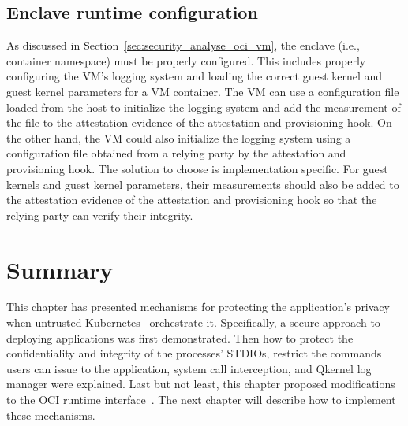 \subsection{Enclave runtime configuration}

As discussed in Section~\ref{sec:security_analyse_oci_vm}, the enclave (i.e., container namespace) must be properly configured. This includes properly configuring the VM's logging system and loading the correct guest kernel and guest kernel parameters for a VM container. The VM can use a configuration file loaded from the host to initialize the logging system 
and add the measurement of the file to the attestation evidence of the attestation and provisioning hook. On the other hand, the VM could also initialize the logging system using a configuration file obtained from a relying party by the attestation and provisioning hook. The solution to choose is implementation specific. For guest kernels and guest kernel parameters, their 
measurements should also be added to the attestation evidence of the attestation and provisioning hook so that the relying party can verify their integrity.
  

\section{Summary}
This chapter has presented mechanisms for protecting the application's privacy when untrusted Kubernetes~\cite*{k8s} orchestrate it. Specifically, a secure approach to deploying applications was first demonstrated. Then how to protect 
the confidentiality and integrity of the processes' STDIOs, restrict the commands users can issue to the application, system call interception, and Qkernel log manager were explained. Last but not least, this chapter proposed modifications to the OCI runtime interface~\cite*{oci-runtime-spec}. 
The next chapter will describe how to implement these mechanisms. 
\cleardoublepage

